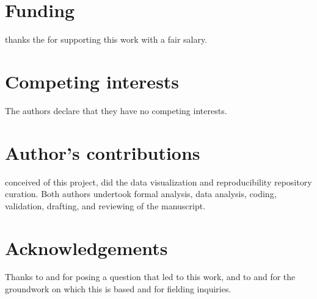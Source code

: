 \documentclass{bmcart}
\begin{document}
\begin{backmatter}

\section*{Funding}
   thanks the  for supporting this work with a fair salary. 
  
\section*{Competing interests}
  The authors declare that they have no competing interests.

\section*{Author's contributions}
   conceived of this project, did the data visualization and reproducibility repository curation. Both authors undertook formal analysis, data analysis, coding, validation, drafting, and reviewing of the manuscript. 

\section*{Acknowledgements}
   Thanks to  and  for posing a question that led to this work, and to  and  for the groundwork on which this is based and for fielding inquiries.



\end{backmatter}
\end{document}
